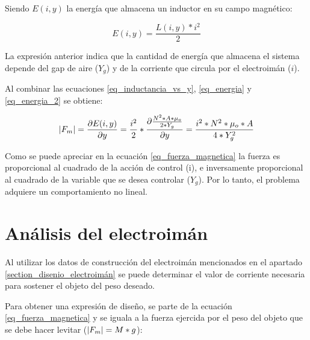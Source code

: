 \noindent Siendo $E(i,y)$ la energía que almacena un inductor en su campo magnético:

\begin{equation}\label{eq_energia_2}
	E(i,y)=\frac{L(i,y)*i^{2}}{2}
\end{equation}

\noindent La expresión anterior indica que la cantidad de energía que almacena el sistema depende del gap de aire ($Y_{g}$) y de la corriente que circula por el electroimán ($i$). 

\noindent Al combinar las ecuaciones \ref{eq_inductancia_vs_y}, \ref{eq_energia} y \ref{eq_energia_2} se obtiene:

\begin{equation}\label{eq_fuerza_magnetica}
	\lvert F_{m}\rvert=\frac{\partial{E(i,y)}}{\partial{y}}=\frac{i^{2}}{2}*\frac{\partial{\frac{{N^{2}*A*\mu_{o}}}{2*Y_{g}}}}{\partial{y}}=\frac{i^{2}*N^{2}*\mu_{o}*A}{4*Y_{g}^{2}}
\end{equation}

\noindent Como se puede apreciar en la ecuación \ref{eq_fuerza_magnetica} la fuerza es proporcional al cuadrado de la acción de control (i), e inversamente proporcional al cuadrado de la variable que se desea controlar ($Y_{g}$). Por lo tanto, el problema adquiere un comportamiento no lineal.


\section{Análisis del electroimán}

\noindent Al utilizar los datos de construcción del electroimán mencionados en el apartado \ref{section_disenio_electroimán} se puede determinar el valor de corriente necesaria para sostener el objeto del peso deseado.
	


\noindent Para obtener una expresión de diseño, se parte de la ecuación \ref{eq_fuerza_magnetica} y se iguala a la fuerza ejercida por el peso del objeto que se debe hacer levitar ($\lvert F_{m}\rvert=M*g$):

